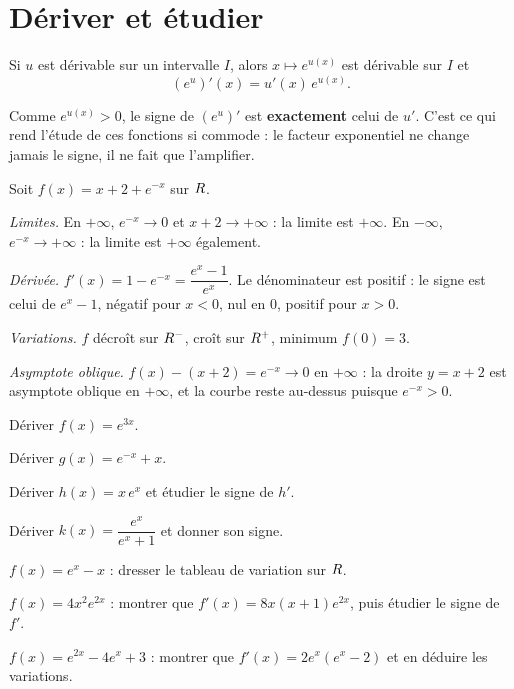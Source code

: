 \section{Dériver et étudier}

\begin{propriete}
Si $u$ est dérivable sur un intervalle $I$, alors $x \mapsto e^{u(x)}$ est
dérivable sur $I$ et
\[
  \left(e^{u}\right)'(x) = u'(x)\,e^{u(x)} .
\]
\end{propriete}

\begin{remarque}
Comme $e^{u(x)} > 0$, le signe de $\left(e^{u}\right)'$ est
\textbf{exactement} celui de $u'$. C'est ce qui rend l'étude de ces fonctions
si commode : le facteur exponentiel ne change jamais le signe, il ne fait que
l'amplifier.
\end{remarque}

\begin{exemple}
Soit $f(x) = x+2+e^{-x}$ sur $R$.

\emph{Limites.} En $+\infty$, $e^{-x} \to 0$ et $x+2 \to +\infty$ : la
limite est $+\infty$. En $-\infty$, $e^{-x} \to +\infty$ : la limite est
$+\infty$ également.

\emph{Dérivée.} $f'(x) = 1-e^{-x} = \dfrac{e^{x}-1}{e^{x}}$. Le dénominateur
est positif : le signe est celui de $e^{x}-1$, négatif pour $x<0$, nul en
$0$, positif pour $x>0$.

\emph{Variations.} $f$ décroît sur $R^{-}$, croît sur $R^{+}$, minimum
$f(0) = 3$.

\emph{Asymptote oblique.} $f(x)-(x+2) = e^{-x} \to 0$ en $+\infty$ : la
droite $y = x+2$ est asymptote oblique en $+\infty$, et la courbe reste
au-dessus puisque $e^{-x}>0$.
\end{exemple}

\begin{entrainement}
\exo[\niveau{1}] Dériver $f(x) = e^{3x}$.

\exo[\niveau{1}] Dériver $g(x) = e^{-x}+x$.

\exo[\niveau{2}] Dériver $h(x) = x\,e^{x}$ et étudier le signe de $h'$.

\exo[\niveau{2}] Dériver $k(x) = \dfrac{e^{x}}{e^{x}+1}$ et donner son
signe.

\exo[\niveau{2}] $f(x) = e^{x}-x$ : dresser le tableau de variation sur
$R$.

\exo[\niveau{3}] $f(x) = 4x^{2}e^{2x}$ : montrer que
$f'(x) = 8x(x+1)e^{2x}$, puis étudier le signe de $f'$.

\exo[\niveau{3}] $f(x) = e^{2x}-4e^{x}+3$ : montrer que
$f'(x) = 2e^{x}\left(e^{x}-2\right)$ et en déduire les variations.
\end{entrainement}

